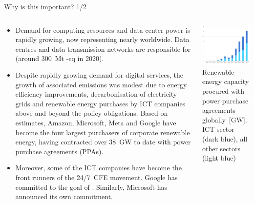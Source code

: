 \begin{frame}{Why is this important? 1/2}

  {\footnotesize

  \begin{columns}[T]
    \begin{column}{9cm}
      \begin{itemize}
        \item   
        Demand for computing resources and data center power is rapidly growing, now representing nearly  worldwide. 
        Data centres and data transmission networks are responsible for  (around 300~Mt \co-eq in 2020).
      
        \item Despite rapidly growing demand for digital services, the growth of associated emissions was modest due to energy efficiency improvements, decarbonisation of electricity grids and renewable energy purchases by ICT companies above and beyond the policy obligations. Based on  estimates, Amazon, Microsoft, Meta and Google have become the four largest purchasers of corporate renewable energy, having contracted over 38~GW to date with power purchase agreements (PPAs).
      
        \item Moreover, some of the ICT companies have become the front runners of the 24/7~CFE movement. Google has committed to the goal of . Similarly, Microsoft has announced its own  commitment.

      \end{itemize}
      \end{column}
  
      \begin{column}{6cm}
      \centering
      \vspace{.3cm}
      \includegraphics[width=6cm]{images/iea-PPAbysector-2010-2021.png}
      {\scriptsize
      Renewable energy capacity procured with power purchase agreements globally~[GW]. \\
      ICT sector (dark blue), all other sectors (light blue)}
    \end{column}
  

\end{columns}}
\end{frame}
